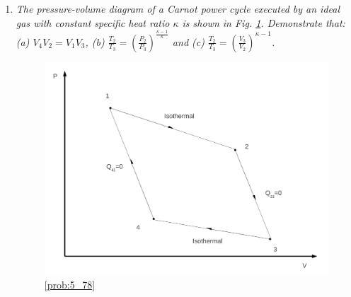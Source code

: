 \documentclass[12pts,a4paper,amsmath,amssymb,floatfix]{article}%
\newcommand{\frc}{\displaystyle\frac}
\begin{document}
\begin{enumerate}[label=\bfseries Problem \arabic*:]
\item \label{prob:5_78}{\it The pressure-volume diagram of a Carnot power cycle executed by an ideal gas with constant specific heat ratio $\kappa$ is shown in Fig. \ref{Prob_Saphiro_5.78}. Demonstrate that: (a) $V_{4}V_{2}=V_{1}V_{3}$, (b) $\frc{T_{2}}{T_{3}} = \left(\frc{P_{2}}{P_{3}}\right)^{\frc{\kappa - 1}{\kappa}}$ and (c) $\frc{T_{2}}{T_{3}}=\left(\frc{V_{3}}{V_{2}}\right)^{\kappa - 1}$.}
\begin{figure}[h]
\begin{center}
\includegraphics[width=8.cm,clip]{./../../ThermalEngines/Pics/Problem_5_78}
\caption{ \ref{prob:5_78}}
\label{Prob_Saphiro_5.78}
\end{center}
\end{figure}


\end{enumerate}
\end{document}
